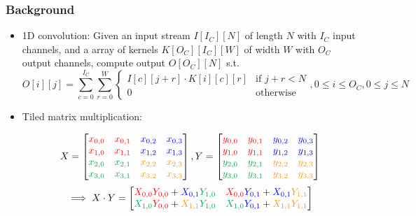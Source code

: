 \documentclass[aspectratio=169]{beamer}
\begin{document}
\begin{frame}
\frametitle{Background}
\begin{itemize}
\item 1D convolution: Given an input stream $I[I_C][N]$ of length $N$ with $I_C$ input channels, and a array of kernels $K[O_C][I_C][W]$ of width $W$ with $O_C$ output channels, compute output $O[O_C][N]$ s.t.
$$ O[i][j] = \sum_{c = 0}^{I_C} \sum_{r = 0}^{W} \begin{cases} I[c][j+r] \cdot K[i][c][r] & \text{if } j+r<N \\ 0 & \text{otherwise} \end{cases}, 0 \leq i \leq O_C, 0 \leq j \leq N $$\pause
\item Tiled matrix multiplication:

$$X = \begin{bmatrix}
\color{red} x_{0,0}& \color{red} x_{0,1}& \color{blue} x_{0,2}& \color{blue} x_{0,3}\\
\color{red} x_{1,0}& \color{red} x_{1,1}& \color{blue} x_{1,2}& \color{blue} x_{1,3}\\
\color{Green} x_{2,0}& \color{Green} x_{2,1}& \color{YellowOrange} x_{2,2}& \color{YellowOrange} x_{2,3}\\
\color{Green} x_{3,0}& \color{Green} x_{3,1}& \color{YellowOrange} x_{3,2}& \color{YellowOrange} x_{3,3}\\
\end{bmatrix}, Y = \begin{bmatrix}
\color{red} y_{0,0}& \color{red} y_{0,1}& \color{blue} y_{0,2}& \color{blue} y_{0,3}\\
\color{red} y_{1,0}& \color{red} y_{1,1}& \color{blue} y_{1,2}& \color{blue} y_{1,3}\\
\color{Green} y_{2,0}& \color{Green} y_{2,1}& \color{YellowOrange} y_{2,2}& \color{YellowOrange} y_{2,3}\\
\color{Green} y_{3,0}& \color{Green} y_{3,1}& \color{YellowOrange} y_{3,2}& \color{YellowOrange} y_{3,3}\\
    \end{bmatrix}$$
$$ \implies X \cdot Y = \begin{bmatrix}
{\color{red}X_{0,0}}{\color{red}Y_{0,0}} +  {\color{blue}X_{0,1}}{\color{Green}Y_{1,0}} & {\color{red}X_{0,0}}{\color{blue}Y_{0,1}} +  {\color{blue}X_{0,1}}{\color{YellowOrange}Y_{1,1}} \\
{\color{Green}X_{1,0}}{\color{red}Y_{0,0}} +  {\color{YellowOrange}X_{1,1}}{\color{Green}Y_{1,0}} & {\color{Green}X_{1,0}}{\color{blue}Y_{0,1}} +  {\color{YellowOrange}X_{1,1}}{\color{YellowOrange}Y_{1,1}} \\
\end{bmatrix}$$
\end{itemize}
\end{frame}
\end{document}
